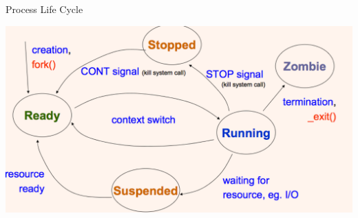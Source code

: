 \documentclass[12pt,a4paper]{article}
\theoremstyle{definition}
\begin{document}
\begin{tcolorbox}
	\textsf{Process Life Cycle}
	
	\includegraphics[scale=0.3]{m1/processLifeCycle}
	\centering
\end{tcolorbox}
\end{document}
